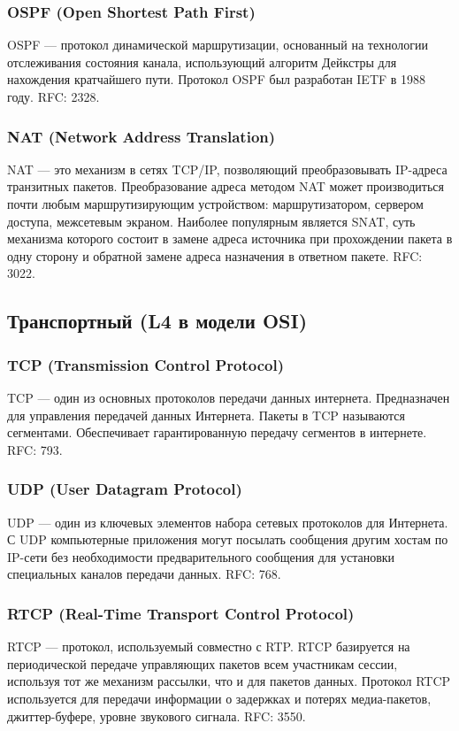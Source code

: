 \subsubsection{OSPF (Open Shortest Path First)}
OSPF — протокол динамической маршрутизации, основанный на технологии отслеживания
состояния канала, использующий алгоритм Дейкстры для нахождения кратчайшего пути.
Протокол OSPF был разработан IETF в 1988 году. RFC: 2328.

\subsubsection{NAT (Network Address Translation)}
NAT — это механизм в сетях TCP/IP, позволяющий преобразовывать IP-адреса транзитных
пакетов. Преобразование адреса методом NAT может производиться почти любым
маршрутизирующим устройством: маршрутизатором, сервером доступа, межсетевым экраном.
Наиболее популярным является SNAT, суть механизма которого состоит в замене адреса
источника при прохождении пакета в одну сторону и обратной замене адреса назначения в
ответном пакете. RFC: 3022.

\subsection{Транспортный (L4 в модели OSI)}

\subsubsection{TCP (Transmission Control Protocol)}
TCP — один из основных протоколов передачи данных интернета. Предназначен для
управления передачей данных Интернета. Пакеты в TCP называются сегментами.
Обеспечивает гарантированную передачу сегментов в интернете. RFC: 793.

\subsubsection{UDP (User Datagram Protocol)}
UDP — один из ключевых элементов набора сетевых протоколов для Интернета. С UDP
компьютерные приложения могут посылать сообщения другим хостам по IP-сети без
необходимости предварительного сообщения для установки специальных каналов передачи
данных. RFC: 768.

\subsubsection{RTCP (Real-Time Transport Control Protocol)}
RTCP — протокол, используемый совместно с RTP. RTCP базируется на периодической
передаче управляющих пакетов всем участникам сессии, используя тот же механизм рассылки,
что и для пакетов данных. Протокол RTCP используется для передачи информации о задержках
и потерях медиа-пакетов, джиттер-буфере, уровне звукового сигнала. RFC: 3550.

